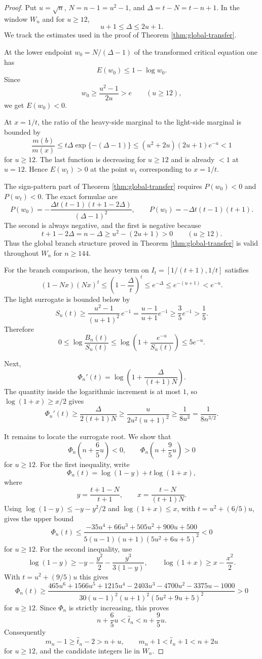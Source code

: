 \documentclass[11pt]{article}
\theoremstyle{definition}
\begin{document}
\begin{proof}
Put $u=\sqrt n$, $N=n-1=u^2-1$, and $\Delta=t-N=t-n+1$.  In the window $W_n$ and for $u\ge12$,
\[
  u+1\le \Delta\le 2u+1.
\]
We track the estimates used in the proof of Theorem \ref{thm:global-transfer}.

At the lower endpoint $w_0=N/(\Delta-1)$ of the transformed critical equation one has
\[
  E(w_0)\le 1-\log w_0.
\]
Since
\[
  w_0\ge \frac{u^2-1}{2u}>e\qquad (u\ge12),
\]
we get $E(w_0)<0$.

At $x=1/t$, the ratio of the heavy-side marginal to the light-side marginal is bounded by
\[
  \frac{m(b)}{m(x)}
  \le t\Delta\exp\{-(\Delta-1)\}
  \le (u^2+2u)(2u+1)e^{-u}<1
\]
for $u\ge12$.  The last function is decreasing for $u\ge12$ and is already $<1$ at $u=12$. Hence $E(w_t)>0$ at the point $w_t$ corresponding to $x=1/t$.

The sign-pattern part of Theorem \ref{thm:global-transfer} requires $P(w_0)<0$ and $P(w_t)<0$. The exact formulae are
\[
  P(w_0)=-\frac{\Delta t(t-1)(t+1-2\Delta)}{(\Delta-1)^2},
  \qquad
  P(w_t)=-\Delta t(t-1)(t+1).
\]
The second is always negative, and the first is negative because
\[
  t+1-2\Delta=n-\Delta\ge u^2-(2u+1)>0\qquad (u\ge12).
\]
Thus the global branch structure proved in Theorem \ref{thm:global-transfer} is valid throughout $W_n$ for $n\ge144$.

For the branch comparison, the heavy term on $I_t=[1/(t+1),1/t]$ satisfies
\[
  (1-Nx)(Nx)^t\le \left(1-\frac{\Delta}{t}\right)^t\le e^{-\Delta}\le e^{-(u+1)}<e^{-u}.
\]
The light surrogate is bounded below by
\[
  S_n(t)\ge \frac{u^2-1}{(u+1)^2}\,e^{-1}
  =\frac{u-1}{u+1}e^{-1}\ge \frac35e^{-1}>\frac15.
\]
Therefore
\[
  0\le \log\frac{B_n(t)}{S_n(t)}
  \le \log\left(1+\frac{e^{-u}}{S_n(t)}\right)
  \le 5e^{-u}.
\]

Next,
\[
  \Phi_n'(t)=\log\left(1+\frac{\Delta}{(t+1)N}\right).
\]
The quantity inside the logarithmic increment is at most $1$, so $\log(1+x)\ge x/2$ gives
\[
  \Phi_n'(t)
  \ge \frac{\Delta}{2(t+1)N}
  \ge \frac{u}{2u^2(u+1)^2}
  \ge \frac{1}{8u^3}=\frac{1}{8n^{3/2}}.
\]

It remains to locate the surrogate root.  We show that
\[
  \Phi_n\left(n+\frac65u\right)<0,
  \qquad
  \Phi_n\left(n+\frac95u\right)>0
\]
for $u\ge12$.  For the first inequality, write
\[
  \Phi_n(t)=\log(1-y)+t\log(1+x),
\]
where
\[
  y=\frac{t+1-N}{t+1},
  \qquad
  x=\frac{t-N}{(t+1)N}.
\]
Using $\log(1-y)\le -y-y^2/2$ and $\log(1+x)\le x$, with $t=u^2+(6/5)u$, gives the upper bound
\[
  \Phi_n(t)
  \le \frac{-35u^4+66u^3+505u^2+900u+500}
          {5(u-1)(u+1)(5u^2+6u+5)^2}<0
\]
for $u\ge12$.
For the second inequality, use
\[
  \log(1-y)\ge -y-\frac{y^2}{2}-\frac{y^3}{3(1-y)},
  \qquad
  \log(1+x)\ge x-\frac{x^2}{2}.
\]
With $t=u^2+(9/5)u$ this gives
\[
  \Phi_n(t)
  \ge
  \frac{465u^6+1566u^5+1215u^4-2403u^3-4700u^2-3375u-1000}
       {30(u-1)^2(u+1)^2(5u^2+9u+5)^2}>0
\]
for $u\ge12$. Since $\Phi_n$ is strictly increasing, this proves
\[
  n+\frac65u<\widehat t_n<n+\frac95u.
\]
Consequently
\[
  m_n-1\ge \widehat t_n-2>n+u,
  \qquad
  m_n+1<\widehat t_n+1<n+2u
\]
for $u\ge12$, and the candidate integers lie in $W_n$.
\end{proof}
\end{document}
